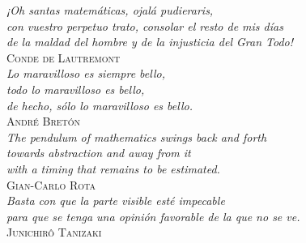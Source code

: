 \documentclass[a4paper,12pt,centertags,intlimits,twoside]{report}
\theoremstyle{definition}
\theoremstyle{definition}
\begin{document}
\newpage
\nopagecolor
\color{black}
\hfill
\thispagestyle{empty} %

\newpage
\thispagestyle{empty} %
\begin{flushright}
    \vspace*{5cm}
    \small\textit{¡Oh santas matemáticas, ojalá pudieraris, \\con vuestro perpetuo trato, consolar el resto de mis días \\de la maldad del hombre y de la injusticia del Gran Todo!}
    \\[1em]\textsc{Conde de Lautremont}
    \\\vspace*{1cm}
    \small\textit{Lo maravilloso es siempre bello, \\todo lo maravilloso es bello, \\de hecho, sólo lo maravilloso es bello.}
    \\[1em]\textsc{André Bretón}
    \\\vspace*{1cm}
    \small\textit{The pendulum of mathematics swings back and forth \\
    towards abstraction and away from it\\
    with a timing that remains to be estimated.}
    \\[1em]\textsc{Gian-Carlo Rota}
    \\\vspace*{1cm}
    \small\textit{Basta con que la parte visible esté impecable 
    \\para que se tenga una opinión favorable de la que no se ve.}
    \\[1em]\textsc{Junichirô Tanizaki}
\end{flushright}

\newpage
\hfill
\thispagestyle{empty} %

\newpage
\renewcommand{\contentsname}{\LARGE Índice de contenidos}
{
    \hypersetup{linkcolor = .}
    \tableofcontents 
}

\thispagestyle{empty} %

\newpage
\hfill
\thispagestyle{empty} %

\setcounter{page}{0} %












\newpage
\hfill
\thispagestyle{empty} %


\end{document}
